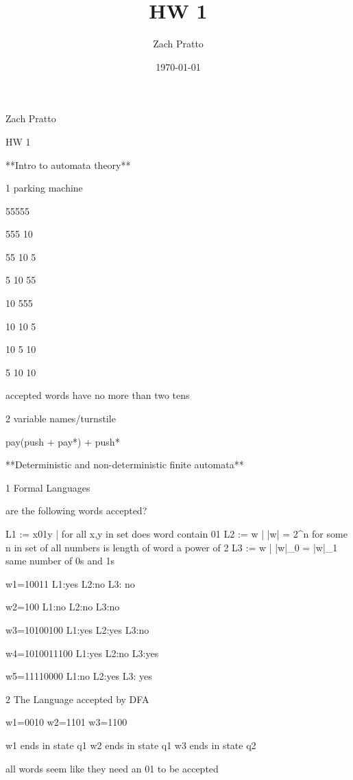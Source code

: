 \documentclass{article}
\begin{document}
\title{HW 1}
\author{Zach Pratto}
\date{\today}
\maketitle

Zach Pratto

HW 1

**Intro to automata theory** 

1 parking machine

55555

555 10

55 10 5

5 10 55

10 555


10 10 5

10 5 10

5 10 10

accepted words have no more than two tens


2 variable names/turnstile


pay(push + pay*) + push*

**Deterministic and non-deterministic finite automata**

1 Formal Languages

are the following words accepted?

L1 := {x01y | for all x,y in set}
	does word contain 01
L2 := {w | |w| = 2^n for some n in set of all numbers}
	is length of word a power of 2
L3 := {w | |w|_0 = |w|_1}
	same number of 0s and 1s

w1=10011
L1:yes L2:no L3: no

w2=100
L1:no L2:no L3:no

w3=10100100
L1:yes L2:yes L3:no

w4=1010011100
L1:yes L2:no L3:yes

w5=11110000
L1:no L2:yes L3: yes

2 The Language accepted by DFA

w1=0010
w2=1101
w3=1100

w1 ends in state q1
w2 ends in state q1
w3 ends in state q2

all words seem like they need an 01 to be accepted
\end{document}
